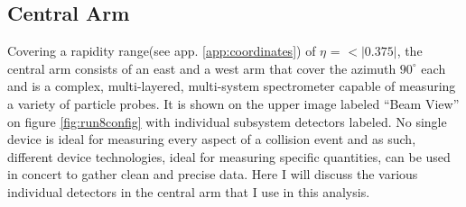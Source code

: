 \subsection{Central Arm}
Covering a rapidity range(see app. \ref{app:coordinates}) of $\eta$ = $<|0.375|$, the central arm consists of an east and a west arm that cover the azimuth $90^{\circ}$ each \citep{EMCfocus}and is a complex, multi-layered, multi-system spectrometer capable of measuring a variety of particle probes. It is shown on the upper image labeled ``Beam View'' on figure \ref{fig:run8config} with individual subsystem detectors labeled. No single device is ideal for measuring every aspect of a collision event and as such, different device technologies, ideal for measuring specific quantities, can be used in concert to gather clean and precise data. Here I will discuss the various individual detectors in the central arm that I use in this analysis.

